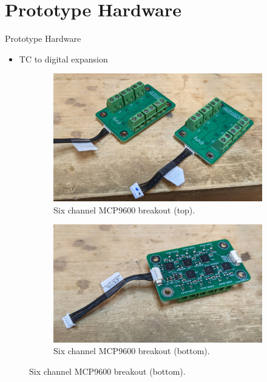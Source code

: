 \documentclass[UKenglish]{beamer}
\begin{document}
\section{Prototype Hardware}
\begin{frame}[allowframebreaks]{Prototype Hardware}
	
	\begin{itemize}
		\item TC to digital expansion
	\end{itemize}
	\begin{figure}[h!]
		\begin{subfigure}{0.4\textwidth}
		\centering
		\includegraphics[width=\textwidth]{images/tc-board-top.jpg}
		\caption{Six channel MCP9600 breakout (top).}
		\end{subfigure}
		\qquad
		\begin{subfigure}{0.4\textwidth}
			\centering
			\includegraphics[width=\textwidth]{images/tc-board-bottom.jpg}
			\caption{Six channel MCP9600 breakout (bottom).}
		\end{subfigure}
	\end{figure}
	

\end{frame}
\end{document}
